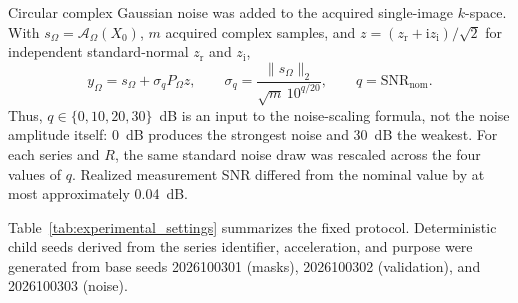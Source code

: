 Circular complex Gaussian noise was added to the acquired single-image $k$-space. With $s_{\Omega}=\mathcal A_{\Omega}(X_0)$, $m$ acquired complex samples, and $z=(z_{\mathrm r}+\mathrm i z_{\mathrm i})/\sqrt2$ for independent standard-normal $z_{\mathrm r}$ and $z_{\mathrm i}$,
\begin{equation}
  y_{\Omega}=s_{\Omega}+\sigma_qP_{\Omega}z,
  \qquad
  \sigma_q=\frac{\lVert s_{\Omega}\rVert_2}
  {\sqrt m\,10^{q/20}},
  \qquad q=\mathrm{SNR}_{\mathrm{nom}}.
  \label{eq:noise_scale}
\end{equation}
Thus, $q\in\{0,10,20,30\}$~dB is an input to the noise-scaling formula, not the noise amplitude itself: 0~dB produces the strongest noise and 30~dB the weakest. For each series and $R$, the same standard noise draw was rescaled across the four values of $q$. Realized measurement SNR differed from the nominal value by at most approximately 0.04~dB.

Table~\ref{tab:experimental_settings} summarizes the fixed protocol. Deterministic child seeds derived from the series identifier, acceleration, and purpose were generated from base seeds 2026100301 (masks), 2026100302 (validation), and 2026100303 (noise).

